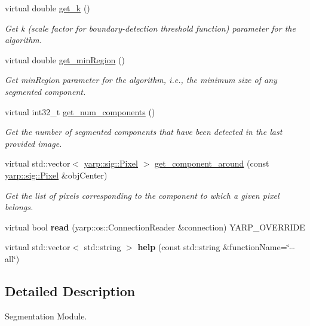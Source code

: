 \begin{DoxyCompactItemize}
virtual double \hyperlink{classGBSegmModule_a44bab99aa7a035e57a185673c040d2f6}{get\+\_\+k} ()
\begin{DoxyCompactList}\small\item\em Get k (scale factor for boundary-\/detection threshold function) parameter for the algorithm. \end{DoxyCompactList}\item 
virtual double \hyperlink{classGBSegmModule_a2378b95e60b406a119947aa86b5bb9c4}{get\+\_\+min\+Region} ()
\begin{DoxyCompactList}\small\item\em Get min\+Region parameter for the algorithm, i.\+e., the minimum size of any segmented component. \end{DoxyCompactList}\item 
virtual int32\+\_\+t \hyperlink{classGBSegmModule_a655ee7c895eed07b07099133b9d8ce68}{get\+\_\+num\+\_\+components} ()
\begin{DoxyCompactList}\small\item\em Get the number of segmented components that have been detected in the last provided image. \end{DoxyCompactList}\item 
virtual std\+::vector$<$ \hyperlink{classyarp_1_1sig_1_1Pixel}{yarp\+::sig\+::\+Pixel} $>$ \hyperlink{classGBSegmModule_a0b63c53513e67c4f126e29cf7f28ad53}{get\+\_\+component\+\_\+around} (const \hyperlink{classyarp_1_1sig_1_1Pixel}{yarp\+::sig\+::\+Pixel} \&obj\+Center)
\begin{DoxyCompactList}\small\item\em Get the list of pixels corresponding to the component to which a given pixel belongs. \end{DoxyCompactList}\item 
\mbox{\label{classyarp_1_1sig_1_1SegmentationModuleInterface_a8ed15458e768ad8dcc58b622a6f1d282}} 
virtual bool {\bfseries read} (yarp\+::os\+::\+Connection\+Reader \&connection) Y\+A\+R\+P\+\_\+\+O\+V\+E\+R\+R\+I\+DE
\item 
\mbox{\label{classyarp_1_1sig_1_1SegmentationModuleInterface_a14ea1dff9efc91a5099633740b3e45f9}} 
virtual std\+::vector$<$ std\+::string $>$ {\bfseries help} (const std\+::string \&function\+Name=\char`\"{}-\/-\/all\char`\"{})
\end{DoxyCompactItemize}


\subsection{Detailed Description}
Segmentation Module. 



